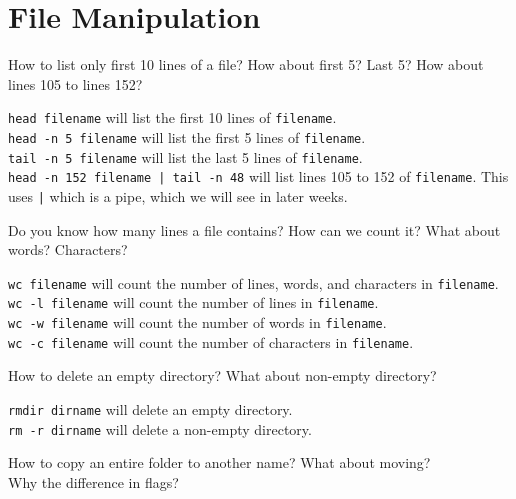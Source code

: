\section{File Manipulation}

\begin{qs}
  How to list only first 10 lines of a file? How about first 5? Last 5?
  How about lines 105 to lines 152?
\end{qs}

\begin{ans}
  \texttt{head filename} will list the first 10 lines of \texttt{filename}. \\
  \texttt{head -n 5 filename} will list the first 5 lines of \texttt{filename}. \\
  \texttt{tail -n 5 filename} will list the last 5 lines of \texttt{filename}. \\
  \texttt{head -n 152 filename | tail -n 48} will list lines 105 to 152 of \texttt{filename}.
  This uses \texttt{|} which is a pipe, which we will see in later weeks.
\end{ans}

\begin{qs}
  Do you know how many lines a file contains? How can we count it?
  What about words? Characters?
\end{qs}

\begin{ans}
  \texttt{wc filename} will count the number of lines, words, and characters in \texttt{filename}. \\
  \texttt{wc -l filename} will count the number of lines in \texttt{filename}. \\
  \texttt{wc -w filename} will count the number of words in \texttt{filename}. \\
  \texttt{wc -c filename} will count the number of characters in \texttt{filename}.
\end{ans}

\begin{qs}
  How to delete an empty directory? What about non-empty directory?
\end{qs}

\begin{ans}
  \texttt{rmdir dirname} will delete an empty directory. \\
  \texttt{rm -r dirname} will delete a non-empty directory.
\end{ans}

\begin{qs}
  How to copy an entire folder to another name? What about moving? \\
  Why the difference in flags?
\end{qs}

